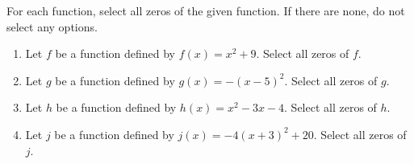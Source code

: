 \documentclass{ximera}
\author{Kenneth Berglund}
\begin{document}
\begin{exercise}
For each function, select all zeros of the given function. If there are none, do not select any options.

\begin{enumerate}
\item Let $f$ be a function defined by $f(x) = x^2 + 9$.
Select all zeros of $f$.
\begin{selectAll}
\end{selectAll}

\item Let $g$ be a function defined by $g(x) = -(x - 5)^2$.
Select all zeros of $g$.
\begin{selectAll}
\end{selectAll}

\item Let $h$ be a function defined by $h(x) = x^2 - 3x - 4$.
Select all zeros of $h$.
\begin{selectAll}
\end{selectAll}

\item Let $j$ be a function defined by $j(x) = -4(x + 3)^2 + 20$.
Select all zeros of $j$.
\begin{selectAll}
\end{selectAll}

\end{enumerate}

\end{exercise}
\end{document}
